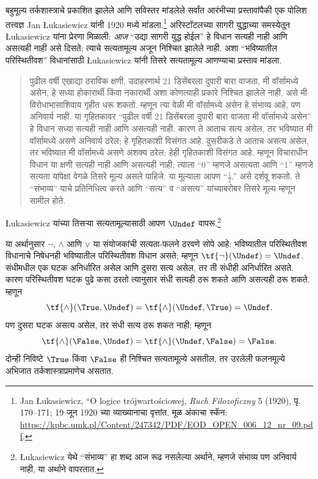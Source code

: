 बहुमूल्य तर्कशास्त्राचे प्रकाशित झालेले आणि सविस्तर मांडलेले
सर्वांत आरंभीच्या प्रस्तावांपैकी एक पोलिश तत्त्वज्ञ Jan \L ukasiewicz
यांनी 1920 मध्ये मांडला.\footnote{Jan \L ukasiewicz,
``O logice trójwartościowej, \emph{Ruch Filozoficzny} 5
(1920), पृ. 170--171; 19 जून 1920 च्या व्याख्यानाचा वृत्तांत.
मूळ अंकाचा स्कॅन: \url{https://kpbc.umk.pl/Content/247342/PDF/EOD_OPEN_006_12_nr_09.pdf}.} अरिस्टॉटलच्या सागरी युद्धाच्या समस्येतून
\L ukasiewicz यांना प्रेरणा मिळाली: \emph{आज} ``उद्या सागरी युद्ध
होईल'' हे विधान सत्यही नाही आणि असत्यही नाही असे दिसते; त्याचे
सत्यतामूल्य अजून निश्चित झालेले नाही. अशा ``भविष्यातील
परिस्थितीवश'' विधानांसाठी \L ukasiewicz यांनी तिसरे सत्यतामूल्य
आणण्याचा प्रस्ताव मांडला.
\begin{quote}
पुढील वर्षी एखाद्या ठराविक क्षणी, उदाहरणार्थ 21 डिसेंबरला दुपारी बारा वाजता,
मी वॉर्सामध्ये असेन, हे सध्या होकारार्थी किंवा नकारार्थी अशा
कोणत्याही प्रकारे निश्चित झालेले नाही, असे मी विरोधाभासाशिवाय
गृहीत धरू शकतो. म्हणून त्या वेळी मी वॉर्सामध्ये असेन हे संभाव्य
आहे, पण अनिवार्य नाही. या गृहितकावर ``पुढील वर्षी 21 डिसेंबरला
दुपारी बारा वाजता मी वॉर्सामध्ये असेन'' हे विधान सध्या सत्यही नाही आणि
असत्यही नाही. कारण ते आताच सत्य असेल, तर भविष्यात मी
वॉर्सामध्ये असणे अनिवार्य ठरेल; हे गृहितकाशी विसंगत आहे.
दुसरीकडे ते आताच असत्य असेल, तर भविष्यात मी वॉर्सामध्ये असणे
अशक्य ठरेल; हेही गृहितकाशी विसंगत आहे. म्हणून विचाराधीन
विधान या क्षणी सत्यही नाही आणि असत्यही नाही; त्याला ``0''
म्हणजे असत्यता आणि ``1'' म्हणजे सत्यता यांपेक्षा वेगळे तिसरे
मूल्य असले पाहिजे. या मूल्याला आपण ``$\frac{1}{2}$.'' असे
दर्शवू शकतो. ते ``संभाव्य'' याचे प्रतिनिधित्व करते आणि
``सत्य'' व ``असत्य'' यांच्याबरोबर तिसरे मूल्य म्हणून सामील होते.
\end{quote}
\L ukasiewicz यांच्या तिसऱ्या सत्यतामूल्यासाठी आपण $\Undef$
वापरू.\footnote{\L ukasiewicz येथे ``संभाव्य'' हा शब्द आज रूढ
नसलेल्या अर्थाने, म्हणजे संभाव्य पण अनिवार्य नाही, या अर्थाने
वापरतात.}

या अर्थानुसार $\lnot$, $\land$ आणि $\lor$ या संयोजकांची
सत्यता-फलने ठरवणे सोपे आहे: भविष्यातील परिस्थितीवश विधानाचे
निषेधनही भविष्यातील परिस्थितीवश विधान असते; म्हणून
$\tf{\lnot}(\Undef) = \Undef$. संधीमधील एक घटक अनिर्धारित
असेल आणि दुसरा सत्य असेल, तर ती संधीही अनिर्धारित असते.
कारण परिस्थितीवश घटक पुढे कसा ठरतो त्यानुसार संधी सत्यही
ठरू शकते आणि असत्यही ठरू शकते. म्हणून \[    \tf{\land}(\True, \Undef) =
\tf{\land}(\Undef, \True) =
\Undef.
\]
पण दुसरा घटक असत्य असेल, तर संधी सत्य ठरू शकत नाही;
म्हणून \[\tf{\land}(\False, \Undef) =
\tf{\land}(\Undef, \False) = \False.\]
दोन्ही निविष्टे $\True$ किंवा $\False$ ही निश्चित सत्यतामूल्ये
असतील, तर उरलेली फलनमूल्ये अभिजात तर्कशास्त्राप्रमाणेच असतात.


